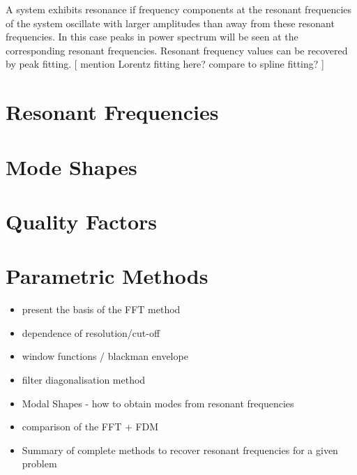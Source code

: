 A system exhibits resonance if frequency components at the resonant frequencies of the system oscillate with larger amplitudes than away from these resonant frequencies. In this case peaks in power spectrum will be seen at the corresponding resonant frequencies. Resonant frequency values can be recovered by peak fitting. [ mention Lorentz fitting here? compare to spline fitting? ]

\section{Resonant Frequencies}
\section{Mode Shapes}
\section{Quality Factors}
\section{Parametric Methods}

\begin{itemize}
  \item present the basis of the FFT method
  \item dependence of resolution/cut-off
	\item window functions / blackman envelope
	\item filter diagonalisation method
	\item Modal Shapes - how to obtain modes from resonant frequencies
  \item comparison of the FFT + FDM
  \item Summary of complete methods to recover resonant frequencies for a given problem
\end{itemize}